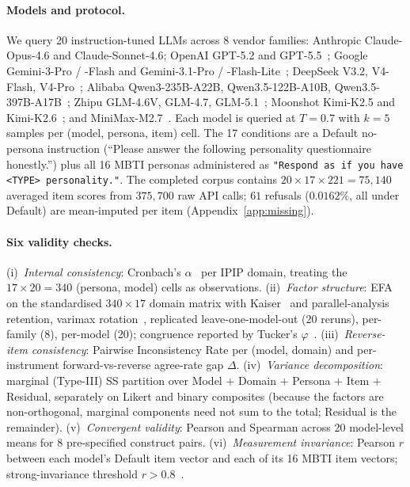 \documentclass[11pt]{article}
\begin{document}
\paragraph{Models and protocol.} We query 20 instruction-tuned LLMs across 8 vendor families: Anthropic Claude-Opus-4.6 and Claude-Sonnet-4.6; OpenAI GPT-5.2 and GPT-5.5~\citep{openai2023gpt4}; Google Gemini-3-Pro / -Flash and Gemini-3.1-Pro / -Flash-Lite~\citep{gemini2024v15}; DeepSeek V3.2, V4-Flash, V4-Pro~\citep{deepseek2024v3}; Alibaba Qwen3-235B-A22B, Qwen3.5-122B-A10B, Qwen3.5-397B-A17B~\citep{qwen2024qwen25}; Zhipu GLM-4.6V, GLM-4.7, GLM-5.1~\citep{glm2024chatglm}; Moonshot Kimi-K2.5 and Kimi-K2.6~\citep{moonshot2025kimi}; and MiniMax-M2.7~\citep{minimax2025minimax01}. Each model is queried at $T{=}0.7$ with $k{=}5$ samples per (model, persona, item) cell. The 17 conditions are a Default no-persona instruction (``Please answer the following personality questionnaire honestly.'') plus all 16 MBTI personas administered as \texttt{"Respond as if you have <TYPE> personality."}. The completed corpus contains $20 \times 17 \times 221 = 75{,}140$ averaged item scores from $375{,}700$ raw API calls; $61$ refusals ($0.0162\%$, all under Default) are mean-imputed per item (Appendix~\ref{app:missing}).

\paragraph{Six validity checks.} (i)~\emph{Internal consistency}: Cronbach's $\alpha$~\citep{cronbach1951coefficient} per IPIP domain, treating the $17 \times 20 = 340$ (persona, model) cells as observations. (ii)~\emph{Factor structure}: EFA on the standardised $340 \times 17$ domain matrix with Kaiser~\citep{kaiser1960application} and parallel-analysis~\citep{horn1965parallel} retention, varimax rotation~\citep{kaiser1958varimax}, replicated leave-one-model-out (20 reruns), per-family (8), per-model (20); congruence reported by Tucker's $\varphi$~\citep{tucker1951method}. (iii)~\emph{Reverse-item consistency}: Pairwise Inconsistency Rate per (model, domain) and per-instrument forward-vs-reverse agree-rate gap $\Delta$. (iv)~\emph{Variance decomposition}: marginal (Type-III) SS partition over Model $+$ Domain $+$ Persona $+$ Item $+$ Residual, separately on Likert and binary composites (because the factors are non-orthogonal, marginal components need not sum to the total; Residual is the remainder). (v)~\emph{Convergent validity}: Pearson and Spearman across 20 model-level means for 8 pre-specified construct pairs. (vi)~\emph{Measurement invariance}: Pearson $r$ between each model's Default item vector and each of its 16 MBTI item vectors; strong-invariance threshold $r > 0.8$~\citep{vandenberg2000review,meredith1993measurement}.
\end{document}
